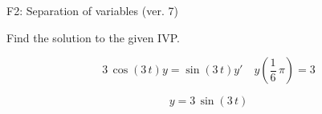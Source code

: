 \begin{exercise}
  \begin{exerciseTitle}F2: Separation of variables (ver. 7)\end{exerciseTitle}
  \begin{exerciseStatement}
    
Find the solution to the given IVP.

    
\[3 \, \cos\left(3 \, t\right) y= \sin\left(3 \, t\right) y'\hspace{1em} y\left( \frac{1}{6} \, \pi \right)= 3\]

  \end{exerciseStatement}
  \begin{exerciseAnswer}
    
\[y= 3 \, \sin\left(3 \, t\right)\]

  \end{exerciseAnswer}
\end{exercise}